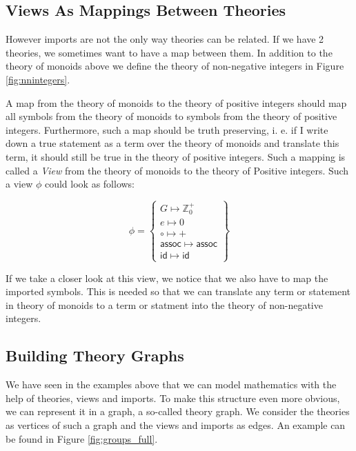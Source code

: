

\subsection{Views As Mappings Between Theories}

However imports are not the only way theories can be related. If we have 2 theories, we sometimes want to have a map between them. In addition to the theory of monoids above we define the theory of non-negative integers in Figure \ref{fig:nnintegers}.



A map from the theory of monoids to the theory of positive integers should map all symbols from the theory of monoids to symbols from the theory of positive integers. Furthermore, such a map should be truth preserving, i. e. if I write down a true statement as a term over the theory of monoids and translate this term, it should still be true  in the theory of positive integers. Such a mapping is called a \textit{View} from the theory of monoids to the theory of Positive integers. Such a view $\phi$ could look as follows:

\[
  \phi=\left\{\begin{array}{l}
  G \mapsto \mathbb{Z}^{+}_{0}\\
  e \mapsto 0\\
  \circ \mapsto +\\
  \mathsf{assoc} \mapsto \mathsf{assoc}\\
  \mathsf{id} \mapsto \mathsf{id}
  \end{array}\right\}
\]

If we take a closer look at this view, we notice that we also have to map the imported symbols. This is needed so that we can translate any term or statement in theory of monoids to a term or statment into the theory of non-negative integers.

\subsection{Building Theory Graphs}

 We have seen in the examples above that we can model mathematics with the help of theories, views and imports. To make this structure even more obvious, we can represent it in a graph, a so-called theory graph. We consider the theories as vertices of such a graph and the views and imports as edges. An example can be found in Figure \ref{fig:groups_full}.

